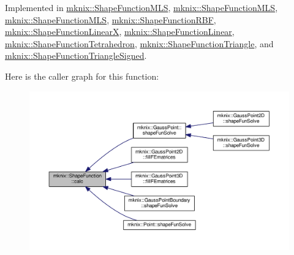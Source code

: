 Implemented in \hyperlink{classmknix_1_1_shape_function_m_l_s_a45b9a5887f30125379ec7ba0ed6fb8c9}{mknix\+::\+Shape\+Function\+M\+L\+S}, \hyperlink{classmknix_1_1_shape_function_m_l_s_a45b9a5887f30125379ec7ba0ed6fb8c9}{mknix\+::\+Shape\+Function\+M\+L\+S}, \hyperlink{classmknix_1_1_shape_function_m_l_s_a45b9a5887f30125379ec7ba0ed6fb8c9}{mknix\+::\+Shape\+Function\+M\+L\+S}, \hyperlink{classmknix_1_1_shape_function_r_b_f_a84441360824f4a8b754d0ae9f547c4ee}{mknix\+::\+Shape\+Function\+R\+B\+F}, \hyperlink{classmknix_1_1_shape_function_linear_x_a31c02d0efc22ef71364924646414d3d0}{mknix\+::\+Shape\+Function\+Linear\+X}, \hyperlink{classmknix_1_1_shape_function_linear_a10cfcd17fcdd6482e7f36b3eaaa9fb9c}{mknix\+::\+Shape\+Function\+Linear}, \hyperlink{classmknix_1_1_shape_function_tetrahedron_a9b09613d74f957f733a03bec83557850}{mknix\+::\+Shape\+Function\+Tetrahedron}, \hyperlink{classmknix_1_1_shape_function_triangle_a7ebaa0c670cb55ee1988d9a0a5400f62}{mknix\+::\+Shape\+Function\+Triangle}, and \hyperlink{classmknix_1_1_shape_function_triangle_signed_a2dd45be9fb2789ac1579f1104c731c3d}{mknix\+::\+Shape\+Function\+Triangle\+Signed}.



Here is the caller graph for this function\+:\nopagebreak
\begin{figure}[H]
\begin{center}
\leavevmode
\includegraphics[width=350pt]{dd/d8d/classmknix_1_1_shape_function_ac4a0d1b43ff7d4adf788e677912a87f7_icgraph}
\end{center}
\end{figure}


\hypertarget{classmknix_1_1_shape_function_a13f35e2b1cfc89c26ee03ede4bfff586}{}
